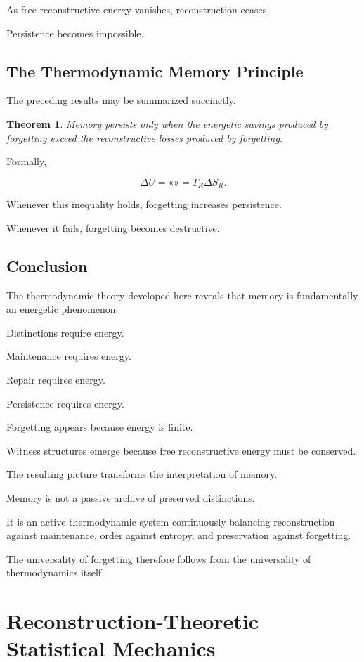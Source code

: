 \documentclass[12pt,oneside]{book}
\theoremstyle{plain} \newtheorem{theorem}{Theorem}[chapter] \newtheorem{lemma}[theorem]{Lemma} \newtheorem{proposition}[theorem]{Proposition} \newtheorem{corollary}[theorem]{Corollary}
\theoremstyle{definition} \newtheorem{definition}[theorem]{Definition} \newtheorem{axiom}[theorem]{Axiom} \newtheorem{construction}[theorem]{Construction}
\theoremstyle{remark} \newtheorem{remark}[theorem]{Remark} \newtheorem{example}[theorem]{Example}
\begin{document}
As free reconstructive energy vanishes, reconstruction ceases.

Persistence becomes impossible.

\section{The Thermodynamic Memory Principle}

The preceding results may be summarized succinctly.

\begin{theorem}

Memory persists only when the energetic savings produced by forgetting exceed the reconstructive losses produced by forgetting.

\end{theorem}

Formally,

\[
\Delta U
=
«»
=
T_R
\Delta S_R.
\]

Whenever this inequality holds, forgetting increases persistence.

Whenever it fails, forgetting becomes destructive.

\section{Conclusion}

The thermodynamic theory developed here reveals that memory is fundamentally an energetic phenomenon.

Distinctions require energy.

Maintenance requires energy.

Repair requires energy.

Persistence requires energy.

Forgetting appears because energy is finite.

Witness structures emerge because free reconstructive energy must be conserved.

The resulting picture transforms the interpretation of memory.

Memory is not a passive archive of preserved distinctions.

It is an active thermodynamic system continuously balancing reconstruction against maintenance, order against entropy, and preservation against forgetting.

The universality of forgetting therefore follows from the universality of thermodynamics itself.

\chapter{Reconstruction-Theoretic Statistical Mechanics}
\end{document}
